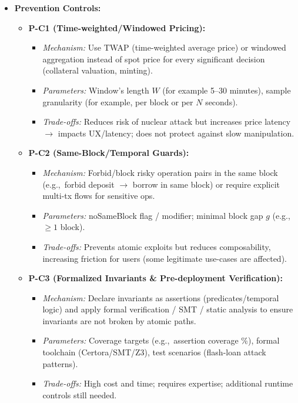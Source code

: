 \begin{itemize}
    \item \textbf{Prevention Controls:}
    \begin{itemize}
        \item \textbf{P-C1 (Time-weighted/Windowed Pricing):}
            \begin{itemize}
                \item \textit{Mechanism:} Use TWAP (time-weighted average price) or windowed aggregation instead of spot price for every significant decision (collateral valuation, minting).
                \item \textit{Parameters:} Window's length $W$ (for example 5--30 minutes), sample granularity (for example, per block or per $N$ seconds).
                \item \textit{Trade-offs:} Reduces risk of nuclear attack but increases price latency $\rightarrow$ impacts UX/latency; does not protect against slow manipulation.
            \end{itemize}
        \item \textbf{P-C2 (Same-Block/Temporal Guards):}
            \begin{itemize}
                \item \textit{Mechanism:} Forbid/block risky operation pairs in the same block (e.g.,\ forbid deposit $\rightarrow$ borrow in same block) or require explicit multi-tx flows for sensitive ops.
                \item \textit{Parameters:} noSameBlock flag / modifier; minimal block gap $g$ (e.g.,\ $\geq 1$ block).
                \item \textit{Trade-offs:} Prevents atomic exploits but reduces composability, increasing friction for users (some legitimate use-cases are affected).
            \end{itemize}
        \item \textbf{P-C3 (Formalized Invariants \& Pre-deployment Verification):}
            \begin{itemize}
                \item \textit{Mechanism:} Declare invariants as assertions (predicates/temporal logic) and apply formal verification / SMT / static analysis to ensure invariants are not broken by atomic paths.
                \item \textit{Parameters:} Coverage targets (e.g.,\ assertion coverage \%), formal toolchain (Certora/SMT/Z3), test scenarios (flash-loan attack patterns).
                \item \textit{Trade-offs:} High cost and time; requires expertise; additional runtime controls still needed.
            \end{itemize}
    \end{itemize}


\end{itemize}
